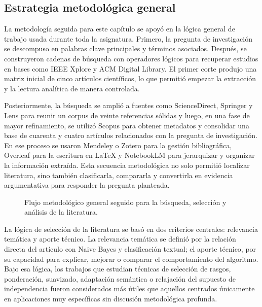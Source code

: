 \subsection{Estrategia metodológica general}

La metodología seguida para este capítulo se apoyó en la lógica general de trabajo usada durante toda la asignatura. Primero, la pregunta de investigación se descompuso en palabras clave principales y términos asociados. Después, se construyeron cadenas de búsqueda con operadores lógicos para recuperar estudios en bases como IEEE Xplore y ACM Digital Library. El primer corte produjo una matriz inicial de cinco artículos científicos, lo que permitió empezar la extracción y la lectura analítica de manera controlada.

Posteriormente, la búsqueda se amplió a fuentes como ScienceDirect, Springer y Lens para reunir un corpus de veinte referencias sólidas y luego, en una fase de mayor refinamiento, se utilizó Scopus para obtener metadatos y consolidar una base de cuarenta y cuatro artículos relacionados con la pregunta de investigación. En ese proceso se usaron Mendeley o Zotero para la gestión bibliográfica, Overleaf para la escritura en LaTeX y NotebookLM para jerarquizar y organizar la información extraída. Esta secuencia metodológica no solo permitió localizar literatura, sino también clasificarla, compararla y convertirla en evidencia argumentativa para responder la pregunta planteada.

\begin{figure}[H]
\centering
{}
\caption{Flujo metodológico general seguido para la búsqueda, selección y análisis de la literatura.}
\label{fig:flujo_metodologico}
\end{figure}

La lógica de selección de la literatura se basó en dos criterios centrales: relevancia temática y aporte técnico. La relevancia temática se definió por la relación directa del artículo con Naive Bayes y clasificación textual; el aporte técnico, por su capacidad para explicar, mejorar o comparar el comportamiento del algoritmo. Bajo esa lógica, los trabajos que estudian técnicas de selección de rasgos, ponderación, suavizado, adaptación semántica o relajación del supuesto de independencia fueron considerados más útiles que aquellos centrados únicamente en aplicaciones muy específicas sin discusión metodológica profunda.

